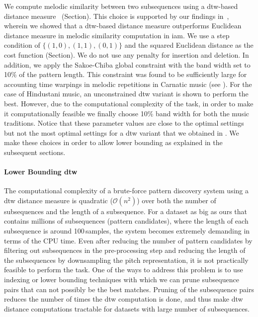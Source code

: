 We compute melodic similarity between two subsequences using a \gls{dtw}-based distance measure~\cite{Sakoe78TASLP} (Section). This choice is supported by our findings in~, wherein we showed that a \gls{dtw}-based distance measure outperforms Euclidean distance measure in melodic similarity computation in \gls{iam}. We use a step condition of $\lbrace(1,0), (1,1), (0,1)\rbrace$ and the squared Euclidean distance as the cost function (Section). We do not use any penalty for insertion and deletion. In addition, we apply the Sakoe-Chiba global constraint with the band width set to 10\% of the pattern length. This constraint was found to be sufficiently large for accounting time warpings in melodic repetitions in Carnatic music (see ). For the case of Hindustani music, an unconstrained \gls{dtw} variant is shown to perform the best. However, due to the computational complexity of the task, in order to make it computationally feasible we finally choose 10\% band width for both the music traditions. Notice that these parameter values are close to the optimal settings but not the most optimal settings for a \gls{dtw} variant that we obtained in . We make these choices in order to allow lower bounding as explained in the subsequent sections. 

	

\paragraph{Lower Bounding \gls{dtw}}
\label{LowerBoundingDTW}

The computational complexity of a brute-force pattern discovery system using a \gls{dtw} distance measure is quadratic ($\mathcal{O}(n^2)$) over both the number of subsequences and the length of a subsequence. For a dataset as big as ours that contains millions of subsequences (pattern candidates), where the length of each subsequence is around 100\,samples, the system becomes extremely demanding in terms of the CPU time. Even after reducing the number of pattern candidates by filtering out subsequences in the pre-processing step and reducing the length of the subsequences by downsampling the pitch representation, it is not practically feasible to perform the task. One of the ways to address this problem is to use indexing or lower bounding techniques with which we can prune subsequence pairs that can not possibly be the best matches. Pruning of the subsequence pairs reduces the number of times the \gls{dtw} computation is done, and thus make \gls{dtw} distance computations tractable for datasets with large number of subsequences.

